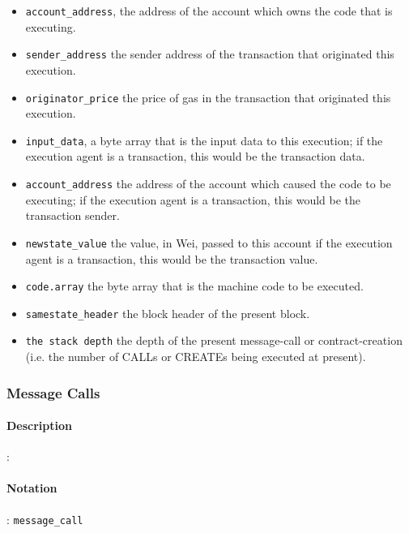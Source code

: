 \documentclass[10pt,a4paper,leqno,bibliography=totoc]{scrartcl}
\newenvironment{alphafootnotes}
{\par\edef\savedfootnotenumber{\number\value{footnote}}
\renewcommand{\thefootnote}{\alph{footnote}}
\setcounter{footnote}{0}}
{\par\setcounter{footnote}{\savedfootnotenumber}}
\begin{document}
\begin{alphafootnotes}
\begin{multicols*}{2}
				\begin{itemize}
					\item \texttt{account\_address}, the address of the account which owns the code that is executing.
					\item \texttt{sender\_address} the sender address of the transaction that originated this execution.
					\item \texttt{originator\_price} the price of gas in the transaction that originated this execution.
					\item \texttt{input\_data}, a byte array that is the input data to this execution; if the execution agent is a transaction, this would be the transaction data.
					\item \texttt{account\_address}  the address of the account which caused the code to be executing; if the execution agent is a transaction, this would be the transaction sender.
					\item \texttt{newstate\_value} the value, in Wei, passed to this account if the execution agent is a transaction, this would be the transaction value.\supercite{Wood2017}
					\item \texttt{code.array} the byte array that is the machine code to be executed.\supercite{Wood2017}
					\item \texttt{samestate\_header} the block header of the present block.
					\item \texttt{the stack depth} the depth of the present message-call or contract-creation (i.e. the number of {\small CALL}s or {\small CREATE}s being executed at present).\supercite{Wood2017}
				\end{itemize}

			\subsubsection{Message Calls}
\paragraph{Description}:\paragraph{Notation}: \texttt{message\_call}

\end{multicols*}
\end{alphafootnotes}
\end{document}
